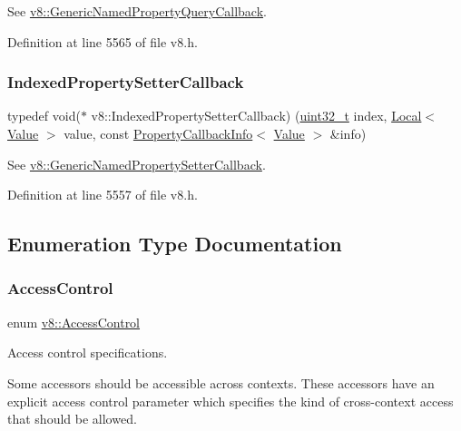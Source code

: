 See {\ttfamily \mbox{\hyperlink{namespacev8_add9f7ab11e4a9a2b9ad2c4536b0e1a64}{v8\+::\+Generic\+Named\+Property\+Query\+Callback}}}. 

Definition at line 5565 of file v8.\+h.

\mbox{\label{namespacev8_a4ac7cc6185ebc8b6a199f9fa8e6bf5c3}} 
\subsubsection{\texorpdfstring{Indexed\+Property\+Setter\+Callback}{IndexedPropertySetterCallback}}
{\footnotesize\ttfamily typedef void($\ast$ v8\+::\+Indexed\+Property\+Setter\+Callback) (\mbox{\hyperlink{classuint32__t}{uint32\+\_\+t}} index, \mbox{\hyperlink{classv8_1_1Local}{Local}}$<$ \mbox{\hyperlink{classv8_1_1Value}{Value}} $>$ value, const \mbox{\hyperlink{classv8_1_1PropertyCallbackInfo}{Property\+Callback\+Info}}$<$ \mbox{\hyperlink{classv8_1_1Value}{Value}} $>$ \&info)}

See {\ttfamily \mbox{\hyperlink{namespacev8_af74716c6e95a269c6cd4314662fd0a7e}{v8\+::\+Generic\+Named\+Property\+Setter\+Callback}}}. 

Definition at line 5557 of file v8.\+h.



\subsection{Enumeration Type Documentation}
\mbox{\label{namespacev8_a31d8355cb043d7d2dda3f4a52760b64e}} 
\subsubsection{\texorpdfstring{Access\+Control}{AccessControl}}
{\footnotesize\ttfamily enum \mbox{\hyperlink{namespacev8_a31d8355cb043d7d2dda3f4a52760b64e}{v8\+::\+Access\+Control}}}

Access control specifications.

Some accessors should be accessible across contexts. These accessors have an explicit access control parameter which specifies the kind of cross-\/context access that should be allowed.

